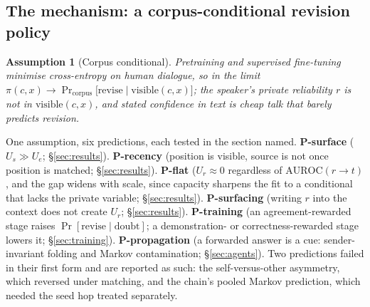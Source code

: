 \documentclass{article}
\newtheorem{assumption}{Assumption}
\newcommand{\Uz}[1]{U_{#1}}
\begin{document}
\subsection{The mechanism: a corpus-conditional revision policy}
\begin{assumption}[Corpus conditional]\label{ass:corpus}
Pretraining and supervised fine-tuning minimise cross-entropy on human dialogue, so in the limit $\pi(c,x)\to\Pr_{\mathrm{corpus}}\big[\mathrm{revise}\mid \mathrm{visible}(c,x)\big]$; the speaker's private reliability $r$ is not in $\mathrm{visible}(c,x)$, and stated confidence in text is cheap talk that barely predicts revision.
\end{assumption}
One assumption, six predictions, each tested in the section named. \textbf{P-surface} ($\Uz{s}\gg\Uz{e}$; \S\ref{sec:results}). \textbf{P-recency} (position is visible, source is not once position is matched; \S\ref{sec:results}). \textbf{P-flat} ($\Uz{r}\approx0$ regardless of $\mathrm{AUROC}(r\to t)$, and the gap widens with scale, since capacity sharpens the fit to a conditional that lacks the private variable; \S\ref{sec:results}). \textbf{P-surfacing} (writing $r$ into the context does not create $\Uz{r}$; \S\ref{sec:results}). \textbf{P-training} (an agreement-rewarded stage raises $\Pr[\mathrm{revise}\mid\mathrm{doubt}]$; a demonstration- or correctness-rewarded stage lowers it; \S\ref{sec:training}). \textbf{P-propagation} (a forwarded answer is a cue: sender-invariant folding and Markov contamination; \S\ref{sec:agents}). Two predictions failed in their first form and are reported as such: the self-versus-other asymmetry, which reversed under matching, and the chain's pooled Markov prediction, which needed the seed hop treated separately.
\end{document}
